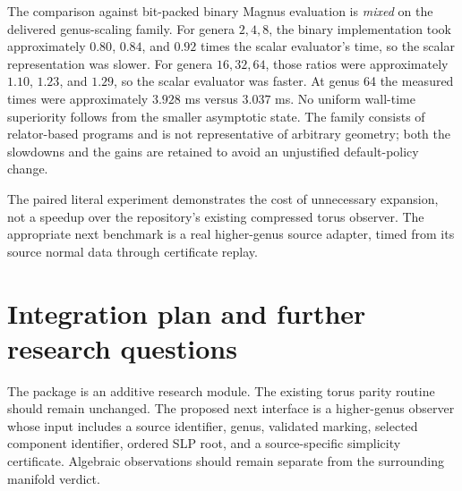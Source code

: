 \documentclass[11pt,letterpaper]{article}
\theoremstyle{definition}
\theoremstyle{remark}
\begin{document}
The comparison against bit-packed binary Magnus evaluation is \emph{mixed} on the delivered genus-scaling family. For genera $2,4,8$, the binary implementation took approximately $0.80$, $0.84$, and $0.92$ times the scalar evaluator's time, so the scalar representation was slower. For genera $16,32,64$, those ratios were approximately $1.10$, $1.23$, and $1.29$, so the scalar evaluator was faster. At genus 64 the measured times were approximately $3.928$ ms versus $3.037$ ms. No uniform wall-time superiority follows from the smaller asymptotic state. The family consists of relator-based programs and is not representative of arbitrary geometry; both the slowdowns and the gains are retained to avoid an unjustified default-policy change.

The paired literal experiment demonstrates the cost of unnecessary expansion, not a speedup over the repository's existing compressed torus observer. The appropriate next benchmark is a real higher-genus source adapter, timed from its source normal data through certificate replay.

\section{Integration plan and further research questions}
\label{sec:questions}
The package is an additive research module. The existing torus parity routine should remain unchanged. The proposed next interface is a higher-genus observer whose input includes a source identifier, genus, validated marking, selected component identifier, ordered SLP root, and a source-specific simplicity certificate. Algebraic observations should remain separate from the surrounding manifold verdict.
\end{document}
